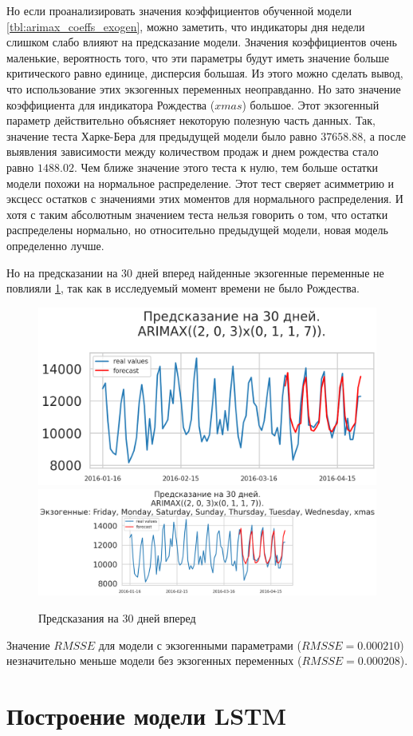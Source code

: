Но если проанализировать значения коэффициентов обученной модели \ref{tbl:arimax_coeffs_exogen},
можно заметить, что индикаторы дня недели слишком слабо влияют на предсказание модели.
Значения коэффициентов очень маленькие, вероятность того, что эти параметры будут иметь
значение больше критического равно единице, дисперсия большая. Из этого можно сделать вывод,
что использование этих экзогенных переменных неоправданно. Но зато значение коэффициента
для индикатора Рождества ($ xmas $) большое. Этот экзогенный параметр
действительно объясняет некоторую полезную часть данных. Так, значение теста Харке-Бера
для предыдущей модели было равно $ 37658.88 $, а после выявления зависимости между количеством продаж
и днем рождества стало равно $ 1488.02 $. Чем ближе значение этого теста к нулю, тем больше остатки
модели похожи на нормальное распределение. Этот тест сверяет асимметрию и эксцесс остатков с
значениями этих моментов для нормального распределения. И хотя с таким абсолютным значением
теста нельзя говорить о том, что остатки распределены нормально, но относительно предыдущей
модели, новая модель определенно лучше.

Но на предсказании на 30 дней вперед найденные экзогенные переменные не повлияли \ref{img:arimax_forecast},
так как в исследуемый момент времени не было Рождества.

\def\figurename{Рис}
\begin{figure}[t]
	\centering
	\includegraphics[width=0.4\columnwidth]{./img/arimax_simple_pred30.png}
	\includegraphics[width=0.4\columnwidth]{./img/arimax_with_exog_pred30.png}
	\caption{Предсказания на 30 дней вперед}
	\label{img:arimax_forecast}
\end{figure}

Значение $ RMSSE $ для модели с экзогенными параметрами ($ RMSSE = 0.000210 $) незначительно меньше
модели без экзогенных переменных ($ RMSSE = 0.000208 $).


\section{Построение модели LSTM}

